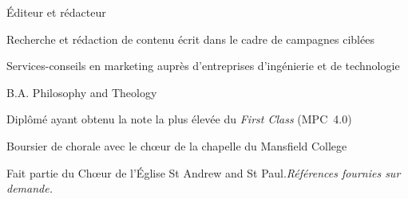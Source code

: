\documentclass{edelgas-resume}
\begin{document}
\begin{position}{Éditeur et rédacteur}{}
\item Recherche et rédaction de contenu écrit dans le cadre de campagnes ciblées
\item Services-conseils en marketing auprès d'entreprises d'ingénierie et de technologie

\end{position}



\begin{position}{B.A. Philosophy and Theology}{}
\item Diplômé ayant obtenu la note la plus élevée du \emph{First Class} (MPC 4.0)
\item Boursier de chorale avec le chœur de la chapelle du Mansfield College
\end{position}

\vspace{-1em}
Fait partie du Chœur de l'Église St Andrew and St Paul.\hfill{\itshape{Références fournies sur demande.}}
\end{document}
